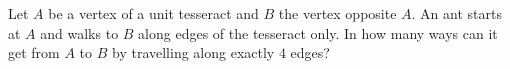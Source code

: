Let $A$ be a vertex of a unit tesseract and $B$ the vertex opposite $A$. An ant starts at $A$ and walks to $B$ along edges of the tesseract only. In how many ways can it get from $A$ to $B$ by travelling along exactly $4$ edges?
